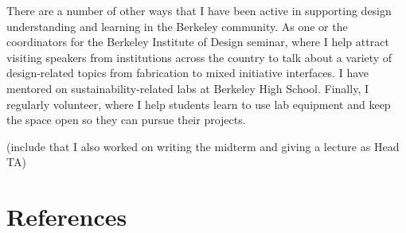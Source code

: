\documentclass[12pt]{memoir}
\begin{document}
There are a number of other ways that I have been active in supporting design understanding and learning in the Berkeley community.
As one or the coordinators for the Berkeley Institute of Design seminar, where I help attract visiting speakers from institutions across the country to talk about a variety of design-related topics from fabrication to mixed initiative interfaces.
I have mentored on sustainability-related labs at Berkeley High School.
Finally, I regularly volunteer, where I help students learn to use lab equipment and keep the space open so they can pursue their projects.

(include that I also worked on writing the midterm and giving a lecture as Head TA)

\section{References}
\printbibliography[heading=none]
\end{document}
